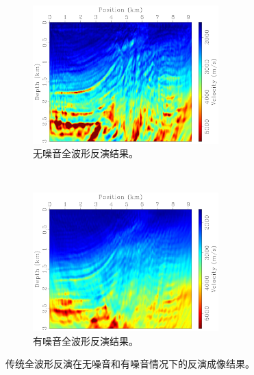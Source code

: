 \documentclass[degree=doctor]{thuthesis}
\begin{document}
\begin{figure}[ht]
    \centering
    \begin{subfigure}[b]{0.5\textwidth}
        \centering
        \includegraphics[height=2.1in]{fwi.pdf}
        \caption{无噪音全波形反演结果。}
        \label{fig:无噪音全波形反演结果}
    \end{subfigure}%
    ~
    \begin{subfigure}[b]{0.5\textwidth}
        \centering
        \includegraphics[height=2.1in]{fwi-noise.pdf}
        \caption{有噪音全波形反演结果。}
        \label{fig:有噪音全波形反演结果}
    \end{subfigure}
    \caption{传统全波形反演在无噪音和有噪音情况下的反演成像结果。}
\end{figure}
\end{document}
